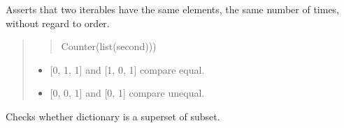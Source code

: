 \documentclass[letterpaper,10pt,english]{sphinxmanual}
\begin{document}
\begin{fulllineitems}
\begin{fulllineitems}
\label{\detokenize{_autosummary/tests.test_unit.test_df:tests.test_unit.test_df.assertCountEqual}}
\pysigstartsignatures
{}
\pysigstopsignatures
\sphinxAtStartPar
Asserts that two iterables have the same elements, the same number of
times, without regard to order.
\begin{quote}
\begin{quote}
\begin{description}
\sphinxAtStartPar
Counter(list(second)))

\end{description}
\end{quote}
\begin{description}
\begin{itemize}
\item {} 
\sphinxAtStartPar
{[}0, 1, 1{]} and {[}1, 0, 1{]} compare equal.

\item {} 
\sphinxAtStartPar
{[}0, 0, 1{]} and {[}0, 1{]} compare unequal.

\end{itemize}

\end{description}
\end{quote}

\end{fulllineitems}


\begin{fulllineitems}
\label{\detokenize{_autosummary/tests.test_unit.test_df:tests.test_unit.test_df.assertDictContainsSubset}}
\pysigstartsignatures
{}
\pysigstopsignatures
\sphinxAtStartPar
Checks whether dictionary is a superset of subset.

\end{fulllineitems}



\end{fulllineitems}
\end{document}
